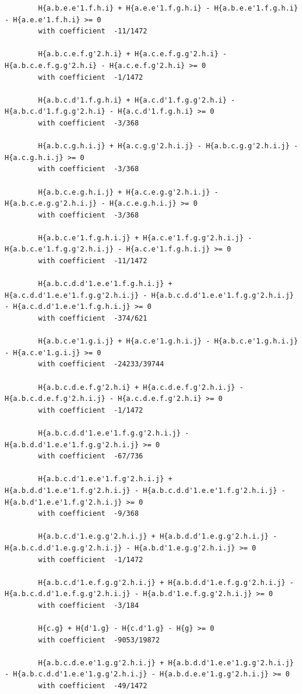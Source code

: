 \documentclass[11pt, a4paper]{kybernetika}
\begin{document}
\begin{verbatim}
		H{a.b.e.e'1.f.h.i} + H{a.e.e'1.f.g.h.i} - H{a.b.e.e'1.f.g.h.i} - H{a.e.e'1.f.h.i} >= 0
		with coefficient  -11/1472
		
		H{a.b.c.e.f.g'2.h.i} + H{a.c.e.f.g.g'2.h.i} - H{a.b.c.e.f.g.g'2.h.i} - H{a.c.e.f.g'2.h.i} >= 0
		with coefficient  -1/1472
		
		H{a.b.c.d'1.f.g.h.i} + H{a.c.d'1.f.g.g'2.h.i} - H{a.b.c.d'1.f.g.g'2.h.i} - H{a.c.d'1.f.g.h.i} >= 0
		with coefficient  -3/368
		
		H{a.b.c.g.h.i.j} + H{a.c.g.g'2.h.i.j} - H{a.b.c.g.g'2.h.i.j} - H{a.c.g.h.i.j} >= 0
		with coefficient  -3/368
		
		H{a.b.c.e.g.h.i.j} + H{a.c.e.g.g'2.h.i.j} - H{a.b.c.e.g.g'2.h.i.j} - H{a.c.e.g.h.i.j} >= 0
		with coefficient  -3/368
		
		H{a.b.c.e'1.f.g.h.i.j} + H{a.c.e'1.f.g.g'2.h.i.j} - H{a.b.c.e'1.f.g.g'2.h.i.j} - H{a.c.e'1.f.g.h.i.j} >= 0
		with coefficient  -11/1472
		
		H{a.b.c.d.d'1.e.e'1.f.g.h.i.j} + H{a.c.d.d'1.e.e'1.f.g.g'2.h.i.j} - H{a.b.c.d.d'1.e.e'1.f.g.g'2.h.i.j} - H{a.c.d.d'1.e.e'1.f.g.h.i.j} >= 0
		with coefficient  -374/621
		
		H{a.b.c.e'1.g.i.j} + H{a.c.e'1.g.h.i.j} - H{a.b.c.e'1.g.h.i.j} - H{a.c.e'1.g.i.j} >= 0
		with coefficient  -24233/39744
		
		H{a.b.c.d.e.f.g'2.h.i} + H{a.c.d.e.f.g'2.h.i.j} - H{a.b.c.d.e.f.g'2.h.i.j} - H{a.c.d.e.f.g'2.h.i} >= 0
		with coefficient  -1/1472
		
		H{a.b.c.d.d'1.e.e'1.f.g.g'2.h.i.j} - H{a.b.d.d'1.e.e'1.f.g.g'2.h.i.j} >= 0
		with coefficient  -67/736
		
		H{a.b.c.d'1.e.e'1.f.g'2.h.i.j} + H{a.b.d.d'1.e.e'1.f.g'2.h.i.j} - H{a.b.c.d.d'1.e.e'1.f.g'2.h.i.j} - H{a.b.d'1.e.e'1.f.g'2.h.i.j} >= 0
		with coefficient  -9/368
		
		H{a.b.c.d'1.e.g.g'2.h.i.j} + H{a.b.d.d'1.e.g.g'2.h.i.j} - H{a.b.c.d.d'1.e.g.g'2.h.i.j} - H{a.b.d'1.e.g.g'2.h.i.j} >= 0
		with coefficient  -1/1472
		
		H{a.b.c.d'1.e.f.g.g'2.h.i.j} + H{a.b.d.d'1.e.f.g.g'2.h.i.j} - H{a.b.c.d.d'1.e.f.g.g'2.h.i.j} - H{a.b.d'1.e.f.g.g'2.h.i.j} >= 0
		with coefficient  -3/184
		
		H{c.g} + H{d'1.g} - H{c.d'1.g} - H{g} >= 0
		with coefficient  -9053/19872
		
		H{a.b.c.d.e.e'1.g.g'2.h.i.j} + H{a.b.d.d'1.e.e'1.g.g'2.h.i.j} - H{a.b.c.d.d'1.e.e'1.g.g'2.h.i.j} - H{a.b.d.e.e'1.g.g'2.h.i.j} >= 0
		with coefficient  -49/1472
		

\end{verbatim}
\end{document}
